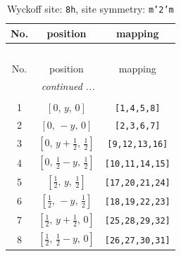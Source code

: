 \documentclass[fleqn,8pt]{jsarticle}
\begin{document}
\begin{longtable}{ccc}
\caption{Wyckoff site: {\tt 8h}, site symmetry: {\tt m'2'm}}
 \\
 \hline \hline
No. & position & mapping \\ \hline \endfirsthead

\multicolumn{2}{l}{\tablename\ \thetable{}} \\
 \hline \hline
No. & position & mapping \\ \hline \endhead

 \hline \hline
\multicolumn{2}{r}{\footnotesize\it continued ...} \\ \endfoot

 \hline \hline
\multicolumn{2}{r}{} \\ \endlastfoot

1 & $\left[ 0,\, y,\, 0 \right]$ & {\tt [1,4,5,8]} \\ \hline
2 & $\left[ 0,\, - y,\, 0 \right]$ & {\tt [2,3,6,7]} \\ \hline
3 & $\left[ 0,\, y + \frac{1}{2},\, \frac{1}{2} \right]$ & {\tt [9,12,13,16]} \\ \hline
4 & $\left[ 0,\, \frac{1}{2} - y,\, \frac{1}{2} \right]$ & {\tt [10,11,14,15]} \\ \hline
5 & $\left[ \frac{1}{2},\, y,\, \frac{1}{2} \right]$ & {\tt [17,20,21,24]} \\ \hline
6 & $\left[ \frac{1}{2},\, - y,\, \frac{1}{2} \right]$ & {\tt [18,19,22,23]} \\ \hline
7 & $\left[ \frac{1}{2},\, y + \frac{1}{2},\, 0 \right]$ & {\tt [25,28,29,32]} \\ \hline
8 & $\left[ \frac{1}{2},\, \frac{1}{2} - y,\, 0 \right]$ & {\tt [26,27,30,31]} \\
\end{longtable}
\renewcommand{\arraystretch}{1.2}
\end{document}
